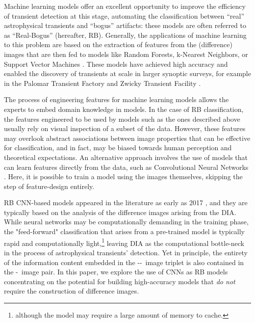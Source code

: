  

Machine learning models offer an excellent opportunity to improve the efficiency of transient detection at this stage, automating the classification between ``real'' astrophysical transients and ``bogus'' artifacts: these models are often referred to as ``Real-Bogus'' (hereafter, RB). Generally, the applications of machine learning to this problem are based on the extraction of features from the (difference) images that are then fed to models like Random Forests, k-Nearest Neighbors, or Support Vector Machines \citep{Goldstein_2015, S_nchez_2019, Mong_2020}. These models have achieved high accuracy and enabled the discovery of transients at scale in larger synoptic surveys, for example in the Palomar Transient Factory \citep[PTF][]{bloom2012automating} and Zwicky Transient Facility \citep[ZTF][]{2019PASP..131c8002M}. 

The process of engineering features for machine learning models allows the experts to embed domain knowledge in models. In the case of RB classification, the features engineered to be used by models such as the ones described above usually rely on visual inspection of a subset of the data. However, these features may overlook abstract associations between image properties that can be effective for classification, and in fact, may be biased towards human perception and theoretical expectations. An alternative approach involves the use of models that can learn features directly from the data, such as Convolutional Neural Networks \citep[CNNs]{lecun1989generalization}.  Here, it is possible to train a model using the images themselves, skipping the step of feature-design entirely.

RB CNN-based models appeared in the literature as early as 2017 \citep{Gieseke_2017}, and they are typically based on the analysis of the difference images arising from the DIA. While neural networks may be computationally demanding in the training phase, the "feed-forward" classification that arises from a pre-trained model is typically rapid and computationally light,\footnote{although the model may require a large amount of memory to cache.} leaving DIA as the computational bottle-neck in the process of astrophysical transients' detection. Yet in principle, the entirety of the information content embedded in the \diff-\temp-\search\ image triplet is also contained in the \temp-\search\ image pair.  In this paper, we explore the use of CNNs as RB models %
concentrating on the potential for building high-accuracy models that \textit{do not} require the construction of difference images.  

